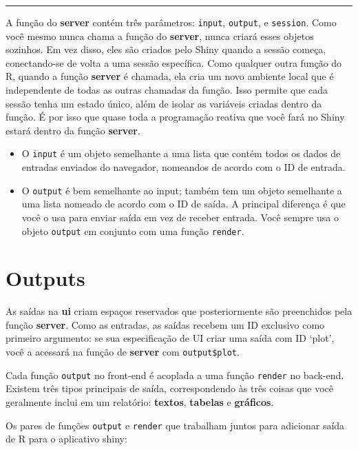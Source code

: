 \documentclass[
]{book}
\begin{document}
\begin{center}\rule{0.5\linewidth}{0.5pt}\end{center}

A função do \textbf{server} contém três parâmetros: \texttt{input}, \texttt{output}, e \texttt{session}. Como você mesmo nunca chama a função do \textbf{server}, nunca criará esses objetos sozinhos. Em vez disso, eles são criados pelo Shiny quando a sessão começa, conectando-se de volta a uma sessão específica. Como qualquer outra função do R, quando a função \textbf{server} é chamada, ela cria um novo ambiente local que é independente de todas as outras chamadas da função. Isso permite que cada sessão tenha um estado único, além de isolar as variáveis criadas dentro da função. É por isso que quase toda a programação reativa que você fará no Shiny estará dentro da função \textbf{server}.

\begin{itemize}
\item
  O \texttt{input} é um objeto semelhante a uma lista que contém todos os dados de entradas enviados do navegador, nomeandos de acordo com o ID de entrada.
\item
  O \texttt{output} é bem semelhante ao input; também tem um objeto semelhante a uma lista nomeado de acordo com o ID de saída. A principal diferença é que você o usa para enviar saída em vez de receber entrada. Você sempre usa o objeto \texttt{output} em conjunto com uma função \texttt{render}.
\end{itemize}

\hypertarget{outputs}{%
\section{\texorpdfstring{\textbf{Outputs}}{Outputs}}\label{outputs}}

As saídas na \textbf{ui} criam espaços reservados que posteriormente são preenchidos pela função \textbf{server}. Como as entradas, as saídas recebem um ID exclusivo como primeiro argumento: se sua especificação de UI criar uma saída com ID `plot', você a acessará na função de \textbf{server} com \texttt{output\$plot}.

Cada função \texttt{output} no front-end é acoplada a uma função \texttt{render} no back-end. Existem três tipos principais de saída, correspondendo às três coisas que você geralmente inclui em um relatório: \textbf{textos}, \textbf{tabelas} e \textbf{gráficos}.

Os pares de funções \texttt{output} e \texttt{render} que trabalham juntos para adicionar saída de R para o aplicativo shiny:
\end{document}
